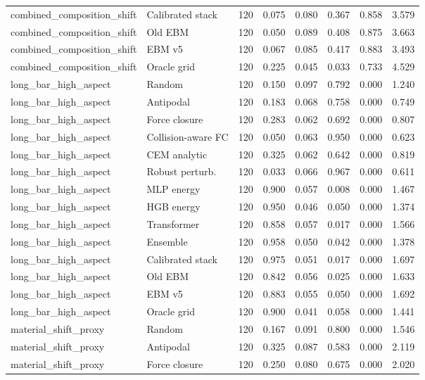 {\begin{longtable}{llrrrrrr}
combined\_composition\_shift & Calibrated stack & 120 & 0.075 & 0.080 & 0.367 & 0.858 & 3.579 \\
combined\_composition\_shift & Old EBM & 120 & 0.050 & 0.089 & 0.408 & 0.875 & 3.663 \\
combined\_composition\_shift & EBM v5 & 120 & 0.067 & 0.085 & 0.417 & 0.883 & 3.493 \\
combined\_composition\_shift & Oracle grid & 120 & 0.225 & 0.045 & 0.033 & 0.733 & 4.529 \\
long\_bar\_high\_aspect & Random & 120 & 0.150 & 0.097 & 0.792 & 0.000 & 1.240 \\
long\_bar\_high\_aspect & Antipodal & 120 & 0.183 & 0.068 & 0.758 & 0.000 & 0.749 \\
long\_bar\_high\_aspect & Force closure & 120 & 0.283 & 0.062 & 0.692 & 0.000 & 0.807 \\
long\_bar\_high\_aspect & Collision-aware FC & 120 & 0.050 & 0.063 & 0.950 & 0.000 & 0.623 \\
long\_bar\_high\_aspect & CEM analytic & 120 & 0.325 & 0.062 & 0.642 & 0.000 & 0.819 \\
long\_bar\_high\_aspect & Robust perturb. & 120 & 0.033 & 0.066 & 0.967 & 0.000 & 0.611 \\
long\_bar\_high\_aspect & MLP energy & 120 & 0.900 & 0.057 & 0.008 & 0.000 & 1.467 \\
long\_bar\_high\_aspect & HGB energy & 120 & 0.950 & 0.046 & 0.050 & 0.000 & 1.374 \\
long\_bar\_high\_aspect & Transformer & 120 & 0.858 & 0.057 & 0.017 & 0.000 & 1.566 \\
long\_bar\_high\_aspect & Ensemble & 120 & 0.958 & 0.050 & 0.042 & 0.000 & 1.378 \\
long\_bar\_high\_aspect & Calibrated stack & 120 & 0.975 & 0.051 & 0.017 & 0.000 & 1.697 \\
long\_bar\_high\_aspect & Old EBM & 120 & 0.842 & 0.056 & 0.025 & 0.000 & 1.633 \\
long\_bar\_high\_aspect & EBM v5 & 120 & 0.883 & 0.055 & 0.050 & 0.000 & 1.692 \\
long\_bar\_high\_aspect & Oracle grid & 120 & 0.900 & 0.041 & 0.058 & 0.000 & 1.441 \\
material\_shift\_proxy & Random & 120 & 0.167 & 0.091 & 0.800 & 0.000 & 1.546 \\
material\_shift\_proxy & Antipodal & 120 & 0.325 & 0.087 & 0.583 & 0.000 & 2.119 \\
material\_shift\_proxy & Force closure & 120 & 0.250 & 0.080 & 0.675 & 0.000 & 2.020 \\

\end{longtable}}
